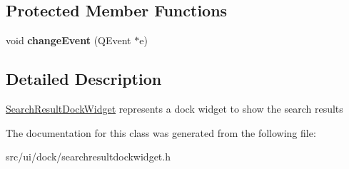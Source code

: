 \subsection*{Protected Member Functions}
\begin{DoxyCompactItemize}
\item 
\hypertarget{classUi_1_1SearchResultDockWidget_afc1ba1d9791caf50917dbf0cd8a34804}{
void {\bfseries changeEvent} (QEvent $\ast$e)}
\label{classUi_1_1SearchResultDockWidget_afc1ba1d9791caf50917dbf0cd8a34804}

\end{DoxyCompactItemize}


\subsection{Detailed Description}
\hyperlink{classUi_1_1SearchResultDockWidget}{SearchResultDockWidget} represents a dock widget to show the search results 

The documentation for this class was generated from the following file:\begin{DoxyCompactItemize}
\item 
src/ui/dock/searchresultdockwidget.h\end{DoxyCompactItemize}
